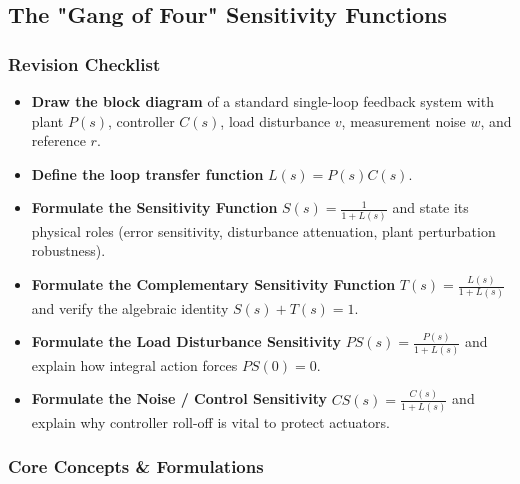 \documentclass[12pt,onecolumn,twoside ]{article}
\begin{document}
	\subsection{The "Gang of Four" Sensitivity Functions}
	\subsubsection{Revision Checklist}
	\begin{itemize}
		\item[$\square$]
		\textbf{Draw the block diagram} of a standard single-loop feedback system with plant $P(s)$, controller $C(s)$, load disturbance $v$, measurement noise $w$, and reference $r$.
		\item[$\square$]
		\textbf{Define the loop transfer function} $L(s) = P(s)C(s)$.
		\item[$\square$]
		\textbf{Formulate the Sensitivity Function} $S(s) = \frac{1}{1 + L(s)}$ and state its physical roles (error sensitivity, disturbance attenuation, plant perturbation robustness).
		\item[$\square$]
		\textbf{Formulate the Complementary Sensitivity Function} $T(s) = \frac{L(s)}{1 + L(s)}$ and verify the algebraic identity $S(s) + T(s) = 1$.
		\item[$\square$]
		\textbf{Formulate the Load Disturbance Sensitivity} $PS(s) = \frac{P(s)}{1 + L(s)}$ and explain how integral action forces $PS(0) = 0$.
		\item[$\square$]
		\textbf{Formulate the Noise / Control Sensitivity} $CS(s) = \frac{C(s)}{1 + L(s)}$ and explain why controller roll-off is vital to protect actuators.
	\end{itemize}
	
	\subsubsection{Core Concepts \& Formulations}
\end{document}
